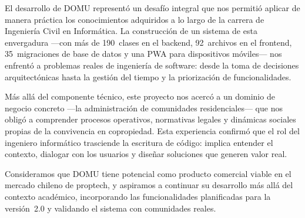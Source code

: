 El desarrollo de DOMU representó un desafío integral que nos permitió aplicar de manera práctica los conocimientos adquiridos a lo largo de la carrera de Ingeniería Civil en Informática. La construcción de un sistema de esta envergadura ---con más de 190~clases en el backend, 92~archivos en el frontend, 35~migraciones de base de datos y una PWA para dispositivos móviles--- nos enfrentó a problemas reales de ingeniería de software: desde la toma de decisiones arquitectónicas hasta la gestión del tiempo y la priorización de funcionalidades.

Más allá del componente técnico, este proyecto nos acercó a un dominio de negocio concreto ---la administración de comunidades residenciales--- que nos obligó a comprender procesos operativos, normativas legales y dinámicas sociales propias de la convivencia en copropiedad. Esta experiencia confirmó que el rol del ingeniero informático trasciende la escritura de código: implica entender el contexto, dialogar con los usuarios y diseñar soluciones que generen valor real.

Consideramos que DOMU tiene potencial como producto comercial viable en el mercado chileno de proptech, y aspiramos a continuar su desarrollo más allá del contexto académico, incorporando las funcionalidades planificadas para la versión~2.0 y validando el sistema con comunidades reales.
